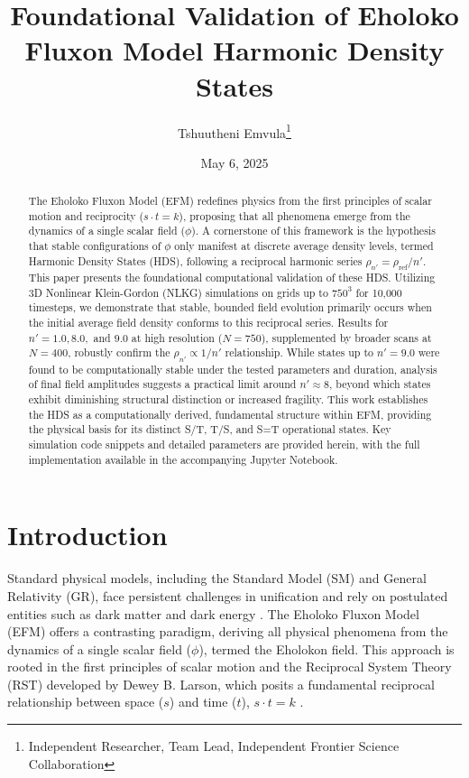 \documentclass[11pt]{article}
\title{Foundational Validation of Eholoko Fluxon Model Harmonic Density States}
\author{Tshuutheni Emvula\thanks{Independent Researcher, Team Lead, Independent Frontier Science Collaboration}}
\date{May 6, 2025}
\begin{document}
\maketitle

\begin{abstract}
The Eholoko Fluxon Model (EFM) redefines physics from the first principles of scalar motion and reciprocity (\(s \cdot t = k\)), proposing that all phenomena emerge from the dynamics of a single scalar field (\(\phi\)). A cornerstone of this framework is the hypothesis that stable configurations of \(\phi\) only manifest at discrete average density levels, termed Harmonic Density States (HDS), following a reciprocal harmonic series \(\rho_{n'} = \rho_{\text{ref}}/n'\). This paper presents the foundational computational validation of these HDS. Utilizing 3D Nonlinear Klein-Gordon (NLKG) simulations on grids up to \(750^3\) for 10,000 timesteps, we demonstrate that stable, bounded field evolution primarily occurs when the initial average field density conforms to this reciprocal series. Results for \(n' = 1.0, 8.0,\) and \(9.0\) at high resolution (\(N=750\)), supplemented by broader scans at \(N=400\), robustly confirm the \(\rho_{n'} \propto 1/n'\) relationship. While states up to \(n'=9.0\) were found to be computationally stable under the tested parameters and duration, analysis of final field amplitudes suggests a practical limit around \(n' \approx 8\), beyond which states exhibit diminishing structural distinction or increased fragility. This work establishes the HDS as a computationally derived, fundamental structure within EFM, providing the physical basis for its distinct S/T, T/S, and S=T operational states. Key simulation code snippets and detailed parameters are provided herein, with the full implementation available in the accompanying Jupyter Notebook.
\end{abstract}

\section{Introduction}
Standard physical models, including the Standard Model (SM) and General Relativity (GR), face persistent challenges in unification and rely on postulated entities such as dark matter and dark energy \citep{planck2018, riess2022}. The Eholoko Fluxon Model (EFM) offers a contrasting paradigm, deriving all physical phenomena from the dynamics of a single scalar field (\(\phi\)), termed the Eholokon field. This approach is rooted in the first principles of scalar motion and the Reciprocal System Theory (RST) developed by Dewey B. Larson, which posits a fundamental reciprocal relationship between space (\(s\)) and time (\(t\)), \(s \cdot t = k\) \citep{larson1959, emvula2025compendium_intro_oct}.
\end{document}
